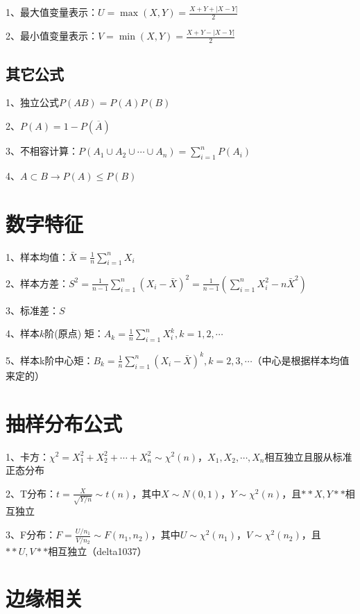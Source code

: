 1、最大值变量表示：$ U=\max (X, Y)=\frac{X+Y+|X-Y|}{2} $



2、最小值变量表示：$ V=\min (X, Y)=\frac{X+Y-|X-Y|}{2} $



\subsection{其它公式}

1、独立公式$ P(AB)=P(A)P(B) $

2、$ P(A)=1-P(\overline A) $

3、不相容计算：$ P\left(A_{1} \cup A_{2} \cup \cdots \cup A_{n}\right)=\sum_{i=1}^{n} P\left(A_{i}\right) $

4、$ A \subset B\rightarrow P(A) \leqslant P(B) $

\section{数字特征}

1、样本均值：$ \bar{X}=\frac{1}{n} \sum_{i=1}^{n} X_{i} $

2、样本方差：$ S^{2}=\frac{1}{n-1} \sum_{i=1}^{n}\left(X_{i}-\bar{X}\right)^{2}=\frac{1}{n-1}\left(\sum_{i=1}^{n} X_{i}^{2}-n \bar{X}^{2}\right) $

3、标准差：$ S $

4、样本$ k $阶(原点) 矩：$ A_{k}=\frac{1}{n} \sum_{i=1}^{n} X_{i}^{k}, k=1,2, \cdots $

5、样本k阶中心矩：$ B_{k}=\frac{1}{n} \sum_{i=1}^{n}\left(X_{i}-\bar{X}\right)^{k}, k=2,3, \cdots $（中心是根据样本均值来定的）

\section{抽样分布公式}

1、卡方：$ \chi^{2} = X_1^2+X_2^2+\cdots+X_n^2 \sim \chi^{2}(n) $，$ X_1,X_2,\cdots ,X_n $相互独立且服从标准正态分布

2、T分布：$ t=\frac{X}{\sqrt{Y/n}} \sim t(n) $，其中$ X \sim N(0,1) $，$ Y\sim \chi^{2}\left(n\right) $，且$ **X,Y** $相互独立

3、F分布：$ F=\frac{U / n_{1}}{V / n_{2}} \sim F\left(n_{1}, n_{2}\right) $，其中$ U \sim \chi^{2}\left(n_{1}\right) $，$  V \sim \chi^{2}\left(n_{2}\right) $，且$ **U,V** $相互独立（delta1037）

\section{边缘相关}

